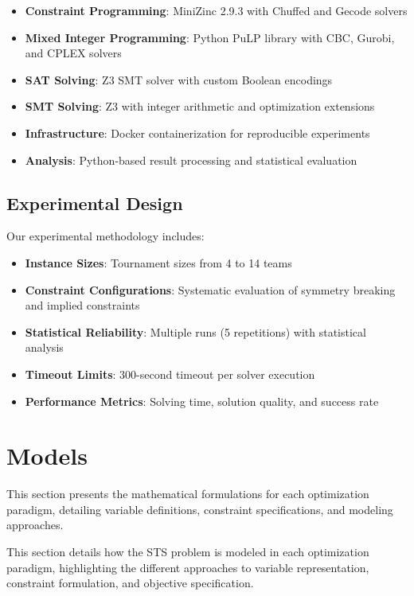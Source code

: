 \documentclass[11pt]{article}
\begin{document}
\begin{itemize}
\begin{itemize}
    \item \textbf{Constraint Programming}: MiniZinc 2.9.3 with Chuffed and Gecode solvers
    \item \textbf{Mixed Integer Programming}: Python PuLP library with CBC, Gurobi, and CPLEX solvers
    \item \textbf{SAT Solving}: Z3 SMT solver with custom Boolean encodings
    \item \textbf{SMT Solving}: Z3 with integer arithmetic and optimization extensions
    \item \textbf{Infrastructure}: Docker containerization for reproducible experiments
    \item \textbf{Analysis}: Python-based result processing and statistical evaluation
\end{itemize}

\subsection{Experimental Design}

Our experimental methodology includes:
\begin{itemize}
    \item \textbf{Instance Sizes}: Tournament sizes from 4 to 14 teams
    \item \textbf{Constraint Configurations}: Systematic evaluation of symmetry breaking and implied constraints
    \item \textbf{Statistical Reliability}: Multiple runs (5 repetitions) with statistical analysis
    \item \textbf{Timeout Limits}: 300-second timeout per solver execution
    \item \textbf{Performance Metrics}: Solving time, solution quality, and success rate
\end{itemize}

\section{Models}

This section presents the mathematical formulations for each optimization paradigm, detailing variable definitions, constraint specifications, and modeling approaches.

This section details how the STS problem is modeled in each optimization paradigm, highlighting the different approaches to variable representation, constraint formulation, and objective specification.


\end{itemize}
\end{document}
